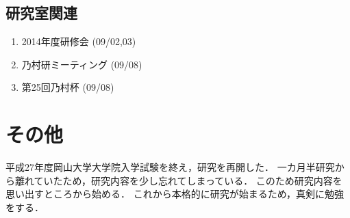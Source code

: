 \documentclass[fleqn, 14pt]{extarticle}
\begin{document}
\subsection{研究室関連}
\label{sec-4-2}

\begin{enumerate}

\item 2014年度研修会
\hfill
\label{enum-6}
(09/02,03)

\item 乃村研ミーティング
\hfill
\label{enum-7}
(09/08)


\item 第25回乃村杯
\hfill
\label{enum-8}
(09/08)

\end{enumerate}
\section{その他}
平成27年度岡山大学大学院入学試験を終え，研究を再開した．
一カ月半研究から離れていたため，研究内容を少し忘れてしまっている．
このため研究内容を思い出すところから始める．
これから本格的に研究が始まるため，真剣に勉強をする．
\end{document}
